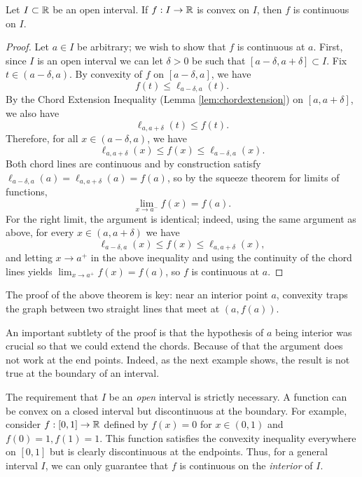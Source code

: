 \documentclass[../analysis1.tex]{subfiles}
\begin{document}
\begin{theorem}
\label{thm:convexcontinuity}
    \begin{shaded*}
        Let $I\subset\mathbb{R}$ be an open interval. If $f: I \to \mathbb{R}$ is convex on $I$, then $f$ is continuous on $I$.
    \end{shaded*}
\end{theorem}
\begin{proof}
    Let $a\in I$ be arbitrary; we wish to show that $f$ is continuous at $a$. First, since $I$ is an open interval we can let $\delta>0$ be such that $[a-\delta,a+\delta]\subset I$. Fix $t\in (a-\delta,a)$. By convexity of $f$ on $[a-\delta,a]$, we have
    \[f(t)\le \ell_{a-\delta,a}(t).\]
    By the Chord Extension Inequality (Lemma \ref{lem:chordextension}) on $[a,a+\delta]$, we also have
    \[\ell_{a,a+\delta}(t)\le f(t).\]Therefore, for all $x\in(a-\delta,a)$, we have \[\ell_{a,a+\delta}(x)\le f(x)\le \ell_{a-\delta,a}(x).\]
    Both chord lines are continuous and by construction satisfy $\ell_{a-\delta,a}(a)=\ell_{a,a+\delta}(a)=f(a)$, so by the squeeze theorem for limits of functions,
    \[\lim_{x\to a^-}f(x)=f(a).\]
    For the right limit, the argument is identical; indeed, using the same argument as above, for every $x\in(a,a+\delta)$ we have \[\ell_{a-\delta,a}(x)\le f(x)\le \ell_{a,a+\delta}(x),\]
    and letting $x\to a^+$ in the above inequality and using the continuity of the chord lines yields $\lim_{x\to a^+}f(x)=f(a)$, so $f$ is continuous at $a$.\qedhere
\end{proof}

The proof of the above theorem is key: near an interior point $a$, convexity traps the graph between two straight lines that meet at $(a,f(a))$.

An important subtlety of the proof is that the hypothesis of $a$ being interior was crucial so that we could extend the chords.
Because of that the argument does not work at the end points.
Indeed, as the next example shows, the result is not true at the boundary of an interval.

\begin{example}
    The requirement that $I$ be an \textit{open} interval is strictly necessary. A function can be convex on a closed interval but discontinuous at the boundary. For example, consider $f: [0,1] \to \mathbb{R}$ defined by $f(x) = 0$ for $x \in (0,1)$ and $f(0)=1, f(1)=1$. This function satisfies the convexity inequality everywhere on $[0,1]$ but is clearly discontinuous at the endpoints. Thus, for a general interval $I$, we can only guarantee that $f$ is continuous on the \textit{interior} of $I$.
\end{example}
\end{document}
